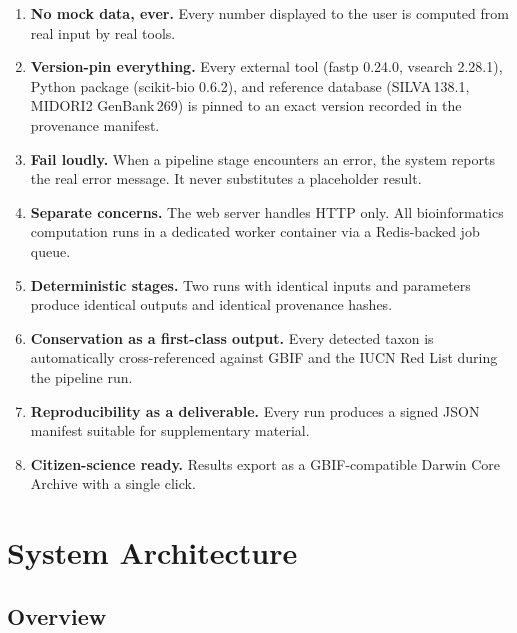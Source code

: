 \documentclass[11pt, a4paper]{article}
\begin{document}
\begin{enumerate}[leftmargin=2em, itemsep=0.3em]
    \item \textbf{No mock data, ever.} Every number displayed to the
    user is computed from real input by real tools.

    \item \textbf{Version-pin everything.} Every external tool (fastp
    0.24.0, vsearch 2.28.1), Python package (scikit-bio 0.6.2), and
    reference database (SILVA\,138.1, MIDORI2 GenBank\,269) is pinned
    to an exact version recorded in the provenance manifest.

    \item \textbf{Fail loudly.} When a pipeline stage encounters an
    error, the system reports the real error message. It never
    substitutes a placeholder result.

    \item \textbf{Separate concerns.} The web server handles HTTP
    only. All bioinformatics computation runs in a dedicated worker
    container via a Redis-backed job queue.

    \item \textbf{Deterministic stages.} Two runs with identical
    inputs and parameters produce identical outputs and identical
    provenance hashes.

    \item \textbf{Conservation as a first-class output.} Every
    detected taxon is automatically cross-referenced against GBIF and
    the IUCN Red List during the pipeline run.

    \item \textbf{Reproducibility as a deliverable.} Every run
    produces a signed JSON manifest suitable for supplementary
    material.

    \item \textbf{Citizen-science ready.} Results export as a
    GBIF-compatible Darwin Core Archive with a single click.
\end{enumerate}


\section{System Architecture}

\subsection{Overview}
\end{document}
